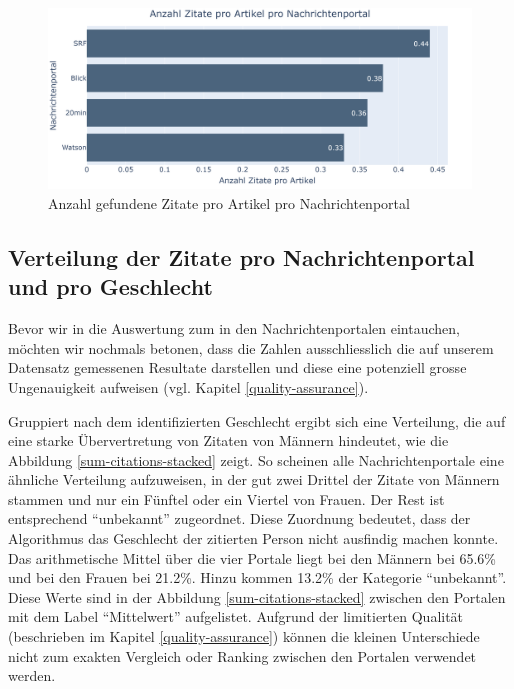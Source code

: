\begin{figure}[H]
	\begin{center}
        \centering
		\includegraphics[width=1\linewidth]{./images/plot_zitate_pro_artikel.PNG}
		\caption{Anzahl gefundene Zitate pro Artikel pro Nachrichtenportal}
		\label{citations-per-article}
	\end{center}
\end{figure}



\subsection{Verteilung der Zitate pro Nachrichtenportal und pro Geschlecht}

Bevor wir in die Auswertung zum  in den Nachrichtenportalen eintauchen, möchten
wir nochmals betonen, dass die Zahlen ausschliesslich die auf unserem Datensatz gemessenen Resultate darstellen
und diese eine potenziell grosse Ungenauigkeit aufweisen (vgl. Kapitel \ref{quality-assurance}).

Gruppiert nach dem identifizierten Geschlecht ergibt sich eine Verteilung, die auf eine starke
Übervertretung von Zitaten von Männern hindeutet, wie die Abbildung \ref{sum-citations-stacked} zeigt.
So scheinen alle Nachrichtenportale eine ähnliche Verteilung aufzuweisen, in der gut zwei Drittel
der Zitate von Männern stammen und nur ein Fünftel oder ein Viertel von Frauen. Der Rest ist entsprechend
\enquote{unbekannt} zugeordnet. Diese Zuordnung bedeutet, dass der Algorithmus das Geschlecht der zitierten Person nicht ausfindig machen konnte.
Das arithmetische Mittel über die vier Portale liegt bei den Männern bei 65.6\% und bei den Frauen bei 21.2\%. Hinzu kommen 13.2\% der Kategorie \enquote{unbekannt}.
Diese Werte sind in der Abbildung \ref{sum-citations-stacked} zwischen den Portalen mit dem Label \enquote{Mittelwert} aufgelistet.
Aufgrund der limitierten Qualität (beschrieben im Kapitel \ref{quality-assurance})
können die kleinen Unterschiede nicht zum exakten Vergleich oder Ranking zwischen den Portalen verwendet werden.

